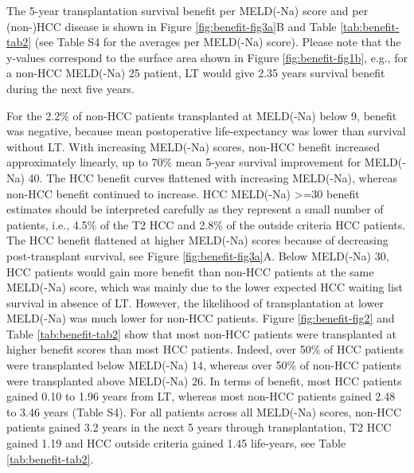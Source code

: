 \documentclass[11pt,english,]{book} %
\begin{document}
The 5-year transplantation survival benefit per MELD(-Na) score and per (non-)HCC disease is shown in Figure \ref{fig:benefit-fig3a}B and Table \ref{tab:benefit-tab2} (see Table S4 for the averages per MELD(-Na) score). Please note that the y-values correspond to the surface area shown in Figure \ref{fig:benefit-fig1b}, e.g., for a non-HCC MELD(-Na) 25 patient, LT would give 2.35 years survival benefit during the next five years.

For the 2.2\% of non-HCC patients transplanted at MELD(-Na) below 9, benefit was negative, because mean postoperative life-expectancy was lower than survival without LT. With increasing MELD(-Na) scores, non-HCC benefit increased approximately linearly, up to 70\% mean 5-year survival improvement for MELD(-Na) 40. The HCC benefit curves flattened with increasing MELD(-Na), whereas non-HCC benefit continued to increase. HCC MELD(-Na) \textgreater=30 benefit estimates should be interpreted carefully as they represent a small number of patients, i.e., 4.5\% of the T2 HCC and 2.8\% of the outside criteria HCC patients. The HCC benefit flattened at higher MELD(-Na) scores because of decreasing post-transplant survival, see Figure \ref{fig:benefit-fig3a}A.
Below MELD(-Na) 30, HCC patients would gain more benefit than non-HCC patients at the same MELD(-Na) score, which was mainly due to the lower expected HCC waiting list survival in absence of LT. However, the likelihood of transplantation at lower MELD(-Na) was much lower for non-HCC patients. Figure \ref{fig:benefit-fig2} and Table \ref{tab:benefit-tab2} show that most non-HCC patients were transplanted at higher benefit scores than most HCC patients. Indeed, over 50\% of HCC patients were transplanted below MELD(-Na) 14, whereas over 50\% of non-HCC patients were transplanted above MELD(-Na) 26. In terms of benefit, most HCC patients gained 0.10 to 1.96 years from LT, whereas most non-HCC patients gained 2.48 to 3.46 years (Table S4). For all patients across all MELD(-Na) scores, non-HCC patients gained 3.2 years in the next 5 years through transplantation, T2 HCC gained 1.19 and HCC outside criteria gained 1.45 life-years, see Table \ref{tab:benefit-tab2}.

\linespread{1}
\end{document}
